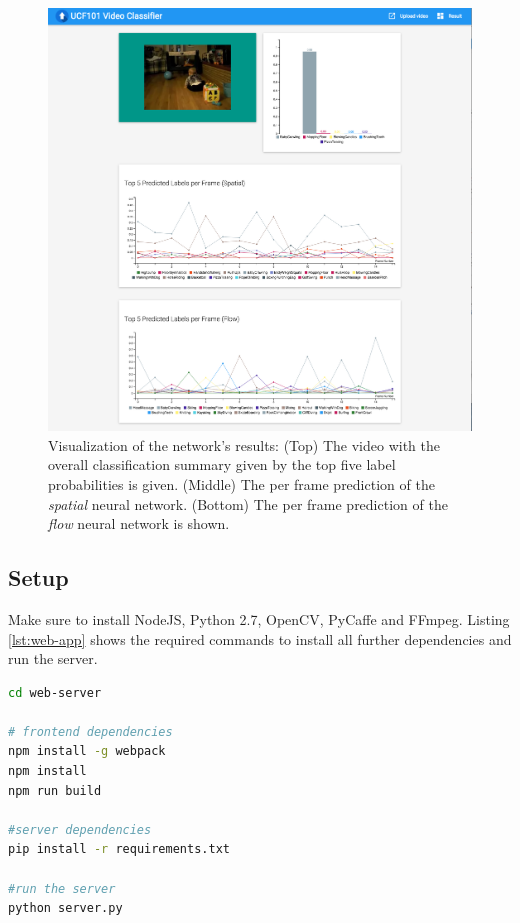 \begin{figure}[]
	\centering
	\includegraphics[width=1\textwidth]{images/screenshot.png}
	\caption{Visualization of the network's results: (Top) The video with the overall classification summary given by the top five label probabilities is given. (Middle) The per frame prediction of the \emph{spatial} neural network. (Bottom) The per frame prediction of the \emph{flow} neural network is shown.}
	\label{fig:web_app}
\end{figure}

\newpage

\subsection{Setup}
Make sure to install NodeJS, Python 2.7, OpenCV, PyCaffe and FFmpeg.
Listing \ref{lst:web-app} shows the required commands to install all further dependencies and run the server.

\begin{lstlisting}[language=sh, caption=Web Application Setup, label=lst:web-app]
cd web-server

# frontend dependencies
npm install -g webpack
npm install
npm run build

#server dependencies
pip install -r requirements.txt

#run the server
python server.py
\end{lstlisting}

